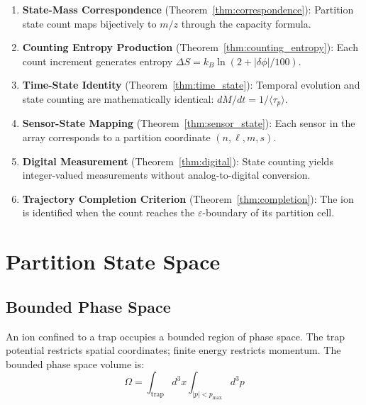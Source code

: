 \documentclass[twocolumn,10pt]{article}
\newcommand{\eps}{\varepsilon}
\begin{document}
\begin{enumerate}
    \item \textbf{State-Mass Correspondence} (Theorem~\ref{thm:correspondence}): Partition state count maps bijectively to $m/z$ through the capacity formula.

    \item \textbf{Counting Entropy Production} (Theorem~\ref{thm:counting_entropy}): Each count increment generates entropy $\Delta S = k_B \ln(2 + |\delta\phi|/100)$.

    \item \textbf{Time-State Identity} (Theorem~\ref{thm:time_state}): Temporal evolution and state counting are mathematically identical: $dM/dt = 1/\langle\tau_p\rangle$.

    \item \textbf{Sensor-State Mapping} (Theorem~\ref{thm:sensor_state}): Each sensor in the array corresponds to a partition coordinate $(n, \ell, m, s)$.

    \item \textbf{Digital Measurement} (Theorem~\ref{thm:digital}): State counting yields integer-valued measurements without analog-to-digital conversion.

    \item \textbf{Trajectory Completion Criterion} (Theorem~\ref{thm:completion}): The ion is identified when the count reaches the $\eps$-boundary of its partition cell.
\end{enumerate}

\section{Partition State Space}
\label{sec:partition}

\subsection{Bounded Phase Space}

An ion confined to a trap occupies a bounded region of phase space. The trap potential restricts spatial coordinates; finite energy restricts momentum. The bounded phase space volume is:
\begin{equation}
    \Omega = \int_{\text{trap}} d^3x \int_{|p| < p_{\max}} d^3p
\end{equation}
\end{document}
